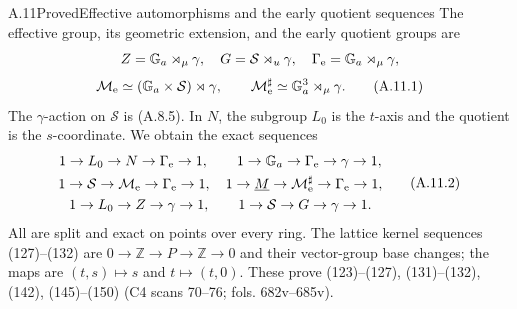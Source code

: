 \begin{statement}{A.11}{Proved}{Effective automorphisms and the early quotient sequences}
The effective group, its geometric extension, and the early quotient
groups are
\[
 Z=\mathbb G_a\rtimes_\mu\gamma,
 \quad G=\mathcal S\rtimes_u\gamma,
 \quad \Gamma_{\rm e}=\mathbb G_a\rtimes_\mu\gamma,
\]
\[
 \mathcal M_{\rm e}\simeq(\mathbb G_a\times\mathcal S)\rtimes\gamma,
 \qquad
 \mathcal M_{\rm e}^{\sharp}\simeq\mathbb G_a^3\rtimes_\mu\gamma.
                                                               \tag{A.11.1}
\]
The $\gamma$-action on $\mathcal S$ is (A.8.5). In $N$, the subgroup
$L_0$ is the $t$-axis and the quotient is the $s$-coordinate. We obtain
the exact sequences
\[
\begin{gathered}
1\to L_0\to N\to\Gamma_{\rm e}\to1,\qquad
1\to\mathbb G_a\to\Gamma_{\rm e}\to\gamma\to1,\\
1\to\mathcal S\to\mathcal M_{\rm e}\to\Gamma_{\rm e}\to1,
\quad
1\to\underline M\to\mathcal M_{\rm e}^{\sharp}\to\Gamma_{\rm e}\to1,\\
1\to L_0\to Z\to\gamma\to1,
\qquad1\to\mathcal S\to G\to\gamma\to1.
\end{gathered}                                                     \tag{A.11.2}
\]
All are split and exact on points over every ring. The lattice kernel
sequences (127)--(132) are
$0\to\mathbb Z\to P\to\mathbb Z\to0$ and their vector-group
base changes; the maps are $(t,s)\mapsto s$ and $t\mapsto(t,0)$.
These prove (123)--(127), (131)--(132), (142), (145)--(150)
(C4 scans 70--76; fols. 682v--685v).
\end{statement}
